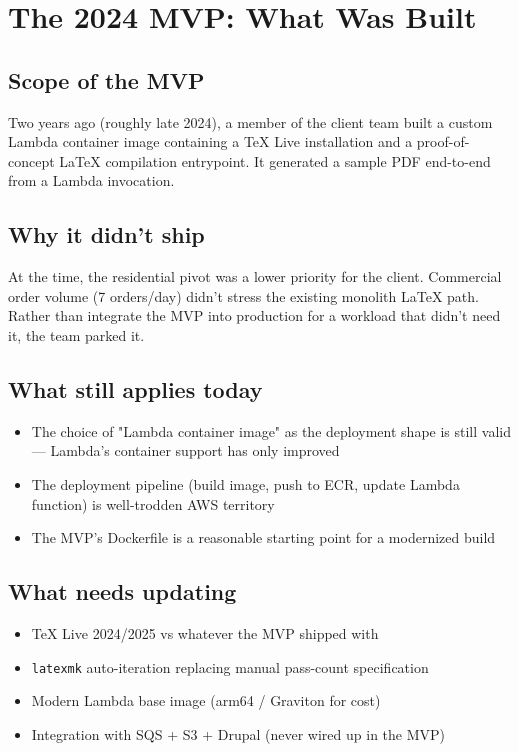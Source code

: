\documentclass[11pt,letterpaper]{article}
\begin{document}
\newpage
\section{The 2024 MVP: What Was Built}
\label{app:mvp}

\subsection{Scope of the MVP}
Two years ago (roughly late 2024), a member of the client team built a custom Lambda container image containing a TeX Live installation and a proof-of-concept LaTeX compilation entrypoint. It generated a sample PDF end-to-end from a Lambda invocation.

\subsection{Why it didn't ship}
At the time, the residential pivot was a lower priority for the client. Commercial order volume (7 orders/day) didn't stress the existing monolith LaTeX path. Rather than integrate the MVP into production for a workload that didn't need it, the team parked it.

\subsection{What still applies today}
\begin{itemize}[nosep]
  \item The choice of "Lambda container image" as the deployment shape is still valid --- Lambda's container support has only improved
  \item The deployment pipeline (build image, push to ECR, update Lambda function) is well-trodden AWS territory
  \item The MVP's Dockerfile is a reasonable starting point for a modernized build
\end{itemize}

\subsection{What needs updating}
\begin{itemize}[nosep]
  \item TeX Live 2024/2025 vs whatever the MVP shipped with
  \item \texttt{latexmk} auto-iteration replacing manual pass-count specification
  \item Modern Lambda base image (arm64 / Graviton for cost)
  \item Integration with SQS + S3 + Drupal (never wired up in the MVP)
\end{itemize}
\end{document}
